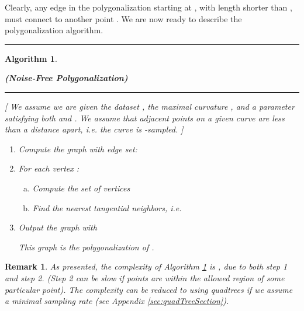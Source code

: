 \documentclass{article}
\newtheorem{varremark}[cntr]{Remark}
\newenvironment{remark}{\begin{varremark}\em}{\em\end{varremark}}
\newtheorem{algo}{Algorithm}
\numberwithin{cntr}{section}
\numberwithin{equation}{section}
\begin{document}
Clearly, any edge in the polygonalization starting at , with length shorter than , must connect to another point .  We are now ready to describe the polygonalization algorithm.

\vspace{.2in}

\hrule
\begin{algo}
  \label{algo:polygonalization}
  \begin{center} {\bf (Noise-Free Polygonalization)}
  \end{center}

\vspace{.1in}

\hrule

\vspace{.2in}

[ We assume we are given
the dataset ,
the maximal curvature , and
a parameter  satisfying both
 and .
We assume that adjacent points on a given curve
are less than a distance  apart, i.e. the curve is
-sampled. ]

\vspace{.1in}

  \begin{enumerate}
  \item Compute the graph  with edge set:
    
  \item For each vertex :
    \begin{enumerate}[a.]
    \item Compute the set of vertices
      
    \item Find the nearest tangential neighbors, i.e.
      
    \end{enumerate}
  \item Output the graph  with
    
    This graph is the polygonalization of .
  \end{enumerate}

\end{algo}

\begin{remark}
  As presented, the complexity of Algorithm \ref{algo:polygonalization} is , due to both step 1 and step 2. (Step 2 can be slow if  points are within the allowed region of some particular point). The complexity can be reduced to  using quadtrees if we assume a minimal sampling rate (see Appendix \ref{sec:quadTreeSection}).
\end{remark}
\end{document}
